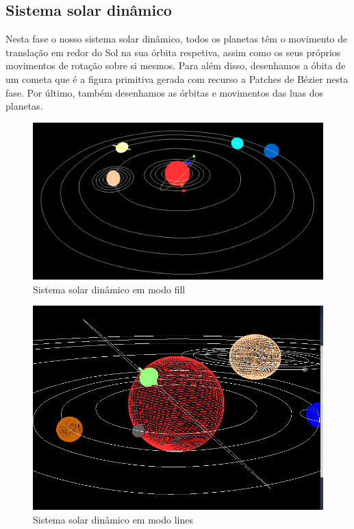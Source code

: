 \documentclass[12pt]{article}
\begin{document}
\subsection{Sistema solar dinâmico}
Nesta fase o nosso sistema solar dinâmico, todos os planetas têm o movimento de translação em redor do Sol na sua órbita respetiva, assim como
os seus próprios movimentos de rotação sobre si mesmos. Para além disso, desenhamos a óbita de um cometa que é a figura primitiva gerada com
recurso a Patches de Bézier nesta fase. Por último, também desenhamos as órbitas e movimentos das luas dos planetas.
\begin{figure}[H]
\centering\includegraphics[scale=0.35]{ll} 
\caption{\label{fig:controller}Sistema solar dinâmico em modo fill}
\end{figure}
\begin{figure}[H]
\centering\includegraphics[scale=0.40]{lines} 
\caption{\label{fig:controller}Sistema solar dinâmico em modo lines}
\end{figure}
\end{document}
